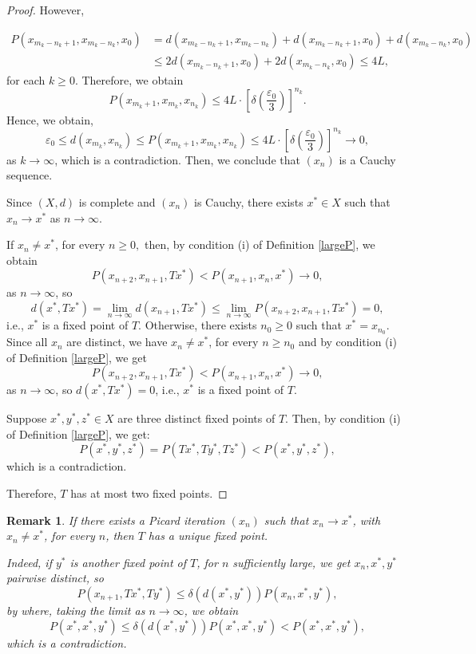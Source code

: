 \documentclass[12 pt]{article}
\theoremstyle{lema}
\theoremstyle{proposition}
\theoremstyle{theorem}
\theoremstyle{theorem}
\newtheorem{remark}{Remark}[section]
\theoremstyle{corollary}
\theoremstyle{definition}
\theoremstyle{example}
\begin{document}
\begin{proof}
		However,
		
		\begin{align*} P(x_{m_k-n_k+1}, x_{m_k-n_k}, x_{0}) &= d(x_{m_k-n_k+1},x_{m_k-n_k})+ d(x_{m_k-n_k+1},x_0)+d(x_{m_k-n_k},x_0)\\ &\leq 2 d(x_{m_k-n_k+1},x_0) + 2 d(x_{m_k-n_k},x_0)\leq 4L, \end{align*}
		for each $k \geq 0$. Therefore, we obtain
		\[P(x_{m_k+1}, x_{m_k}, x_{n_k}) \leq 4L \cdot \left[\delta\left(\dfrac{\varepsilon_0}{3}\right)\right]^{n_k}.  \]
		Hence, we obtain,
		\[\varepsilon_0 \leq d(x_{m_k}, x_{n_k}) \leq P(x_{m_k+1}, x_{m_k}, x_{n_k}) \leq 4L \cdot \left[\delta\left(\dfrac{\varepsilon_0}{3}\right)\right]^{n_k} \to 0, \]
		as $k \to \infty$, which is a contradiction. Then, we conclude that \((x_n)\) is a Cauchy sequence.
		
		Since $(X,d)$ is complete and \((x_n)\) is Cauchy, there exists \(x^*\in X\) such that \(x_n\to x^*\) as \(n \to \infty\).
		
		If \(x_n \neq x^*\), for every \(n \geq 0,\) then, by condition (i) of Definition \ref{largeP}, we obtain 
		\[ P(x_{n+2}, x_{n+1}, Tx^*) < P(x_{n+1}, x_{n}, x^*) \to 0,\]
		as \(n \to \infty\), so \[d(x^*, Tx^*) = \lim\limits_{n\to \infty} d(x_{n+1}, Tx^*) \leq \lim\limits_{n\to \infty} P(x_{n+2}, x_{n+1}, Tx^*) = 0,\] i.e., \(x^*\) is a fixed point of \(T\). Otherwise, there exists \(n_0 \geq 0\) such that \(x^*=x_{n_0}\). Since all \(x_n\) are distinct, we have \(x_n \neq x^*\), for every \(n \geq n_0\) and by condition (i) of Definition \ref{largeP}, we get
		\[ P(x_{n+2}, x_{n+1}, Tx^*) < P(x_{n+1}, x_{n}, x^*) \to 0,\]
		as \(n \to \infty\), so \(d(x^*, Tx^*) = 0\), i.e., \(x^*\) is a fixed point of \(T\).
		
		Suppose \(x^*, y^*, z^* \in X\) are three distinct fixed points of \(T\). Then, by condition (i) of Definition \ref{largeP}, we get:
		\[P(x^*, y^*, z^*) = P(Tx^*, Ty^*, Tz^*) < P(x^*, y^*, z^*),\]
		which is a contradiction.
		
		Therefore, \(T\) has at most two fixed points.
	\end{proof}

	\begin{remark}
		If there exists a Picard iteration \((x_n)\) such that \(x_n \to x^*\), with \(x_n \neq x^*\), for every \(n\), then \(T\) has a unique fixed point.
		
		Indeed, if \(y^*\) is another fixed point of \(T\), for \(n\) sufficiently large, we get \(x_n, x^*, y^*\) pairwise distinct, so 
		\[P(x_{n+1}, Tx^*, Ty^*) \leq \delta(d(x^*,y^*))P(x_n, x^*, y^*),\]
		by where, taking the limit as \(n \to \infty\), we obtain		
		\[P(x^*, x^*, y^*) \leq \delta(d(x^*,y^*))P(x^*, x^*, y^*) < P(x^*,x^*, y^*),\]
		which is a contradiction.
	\end{remark}
\end{document}
